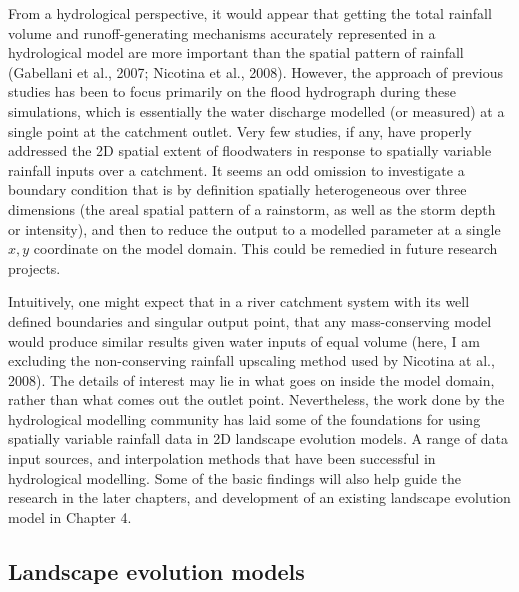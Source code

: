 \documentclass[12pt,oneside,PhD]{muthesis}
\begin{document}
From a hydrological perspective, it would appear that getting the total rainfall volume and runoff-generating mechanisms accurately represented in a hydrological model are more important than the spatial pattern of rainfall (Gabellani et al., 2007; Nicotina et al., 2008). However, the approach of previous studies has been to focus primarily on the flood hydrograph during these simulations, which is essentially the water discharge modelled (or measured) at a single point at the catchment outlet. Very few studies, if any, have properly addressed the 2D spatial extent of floodwaters in response to spatially variable rainfall inputs over a catchment. It seems an odd omission to investigate a boundary condition that is by definition spatially heterogeneous over three dimensions (the areal spatial pattern of a rainstorm, as well as the storm depth or intensity), and then to reduce the output to a modelled parameter at a single \(x,y\) coordinate on the model domain. This could be remedied in future research projects.

Intuitively, one might expect that in a river catchment system with its well defined boundaries and singular output point, that any mass-conserving model would produce similar results given water inputs of equal volume (here, I am excluding the non-conserving rainfall upscaling method used by Nicotina at al., 2008). The details of interest may lie in what goes on inside the model domain, rather than what comes out the outlet point. Nevertheless, the work done by the hydrological modelling community has laid some of the foundations for using spatially variable rainfall data in 2D landscape evolution models. A range of data input sources, and interpolation methods that have been successful in hydrological modelling. Some of the basic findings will also help guide the research in the later chapters, and development of an existing landscape evolution model in Chapter 4.

\subsection{Landscape evolution models}
\end{document}
